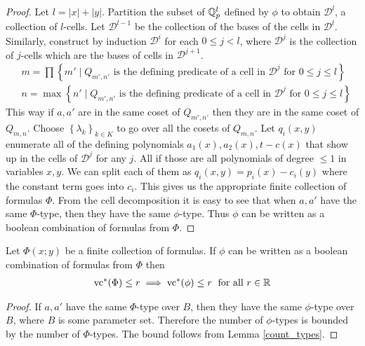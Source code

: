 \documentclass{amsart}
\newcommand{\DD}{\mathscr D}
\newcommand{\curly}[1]{\left\{#1\right\}}
\begin{document}
\begin{proof}
  Let $l = |x| + |y|$.
  Partition the subset of $\mathbb{Q}_p^l$ defined by $\phi$ to obtain $\DD^l$, a collection of $l$-cells.
  Let $\DD^{l-1}$ be the collection of the bases of the cells in $\DD^l$.
  Similarly, construct by induction $\DD^i$ for each $0 \leq j < l$,
  where $\DD^j$ is the collection of $j$-cells which are the bases of cells in $\DD^{j+1}$.
  \begin{align*}
    &m = \prod \curly{m' \mid Q_{m',n'} \text{ is the defining predicate of a cell in $\DD^j$ for $0 \leq j \leq l$} } \\
    &n = \max \curly{n' \mid Q_{m',n'} \text{ is the defining predicate of a cell in $\DD^j$ for $0 \leq j \leq l$} }
  \end{align*}
  This way if $a, a'$ are in the same coset of $Q_{m',n'}$ then they are in the same coset of $Q_{m,n}$.
  Choose $\curly{\lambda_k}_{k \in K}$ to go over all the cosets of $Q_{m,n}$.
  Let $q_i(x, y)$ enumerate all of the defining polynomials $a_1(x), a_2(x), t - c(x)$ that show up in the cells of $\DD^j$ for any $j$.
  All if those are all polynomials of degree $\leq 1$ in variables $x, y$.
  We can split each of them as $q_i(x,y) = p_i(x) - c_i(y)$ where the constant term goes into $c_i$.
  This gives us the appropriate finite collection of formulas $\Phi$.
  From the cell decomposition it is easy to see that when $a, a'$ have the same $\Phi$-type,
  then they have the same $\phi$-type.
  Thus $\phi$ can be written as a boolean combination of formulas from $\Phi$.
\end{proof}

\begin{Lemma}
  Let $\Phi(x; y)$ be a finite collection of formulas.
  If $\phi$ can be written as a boolean combination of formulas from $\Phi$ then
  \begin{align*}
    \operatorname{vc}^* (\Phi) \leq r \implies \operatorname{vc}^* (\phi) \leq r \; \text{ for all } r \in \mathbb{R}
  \end{align*}
\end{Lemma}
\begin{proof}
  If $a,a'$ have the same $\Phi$-type over $B$, then they have the same $\phi$-type over $B$, where $B$ is some parameter set.
  Therefore the number of $\phi$-types is bounded by the number of $\Phi$-types.
  The bound follows from Lemma \ref{count_types}.
\end{proof}
\end{document}
